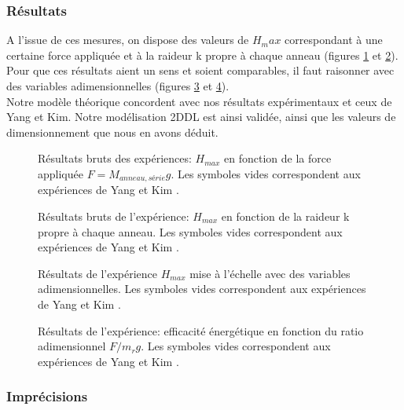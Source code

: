 \subsubsection{Résultats}
A l'issue de ces mesures, on dispose des valeurs de $H_max$ correspondant à une certaine force appliquée et à la raideur k propre à chaque anneau (figures \ref{fig:expresbf} et \ref{fig:expresbk}). Pour que ces résultats aient un sens et soient comparables, il faut raisonner avec des variables adimensionnelles (figures \ref{fig:expmae} et \ref{fig:expeff}). \\

Notre modèle théorique concordent avec nos résultats expérimentaux et ceux de Yang et Kim. Notre modélisation 2DDL est ainsi validée, ainsi que les valeurs de dimensionnement que nous en avons déduit.

\begin{figure}[htb]
\centering
\def\svgwidth{330}

\caption{Résultats bruts des expériences: $H_{max}$ en fonction de la force appliquée $F=M_{anneau,série}g$. Les symboles vides correspondent aux expériences de Yang et Kim \cite{yangkim}.}
\label{fig:expresbf}
\end{figure}

\begin{figure}[htb]
\centering
\def\svgwidth{330}

\caption{Résultats bruts de l'expérience: $H_{max}$ en fonction de la raideur k propre à chaque anneau. Les symboles vides correspondent aux expériences de Yang et Kim \cite{yangkim}.}
\label{fig:expresbk}
\end{figure}

\begin{figure}[htb]
\centering
\def\svgwidth{310}

\caption{Résultats de l'expérience $H_{max}$ mise à l'échelle avec des variables adimensionnelles. Les symboles vides correspondent aux expériences de Yang et Kim \cite{yangkim}.}
\label{fig:expmae}
\end{figure}

\begin{figure}[htb]
\centering
\def\svgwidth{310}

\caption{Résultats de l'expérience: efficacité énergétique en fonction du ratio adimensionnel $F/m_rg$. Les symboles vides correspondent aux expériences de Yang et Kim \cite{yangkim}.}
\label{fig:expeff}
\end{figure}

\subsubsection{Imprécisions}

